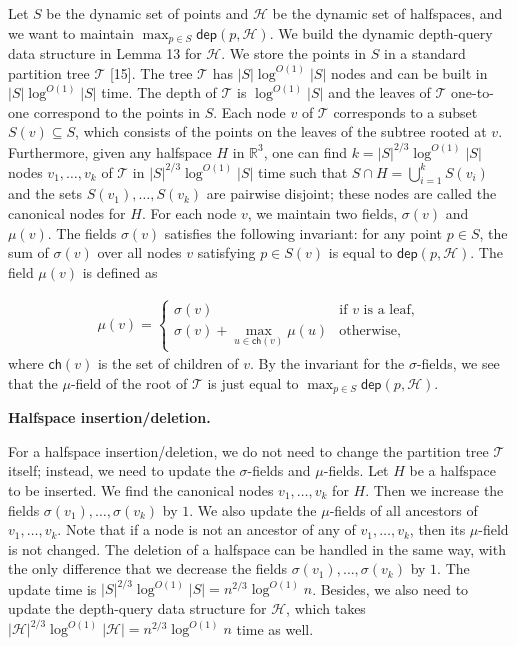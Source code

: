 \documentclass[10pt,a4paper]{article}
\begin{document}
Let $S$ be the dynamic set of points and $\mathcal{H}$ be the dynamic set of halfspaces, and we want to maintain $\max_{p\in S}\mathsf{dep}(p,\mathcal{H})$. We build the dynamic depth-query data structure in Lemma 13 for $\mathcal{H}$. We store the points in $S$ in a standard partition tree $\mathcal{T}$ [15]. The tree $\mathcal{T}$ has $|S|\log^{O(1)}|S|$ nodes and can be built in $|S|\log^{O(1)}|S|$ time. The depth of $\mathcal{T}$ is $\log^{O(1)}|S|$ and the leaves of $\mathcal{T}$ one-to-one correspond to the points in $S$. Each node $v$ of $\mathcal{T}$ corresponds to a subset $S(v)\subseteq S$, which consists of the points on the leaves of the subtree rooted at $v$. Furthermore, given any halfspace $H$ in $\mathbb{R}^{3}$, one can find $k=|S|^{2/3}\log^{O(1)}|S|$ nodes $v_{1},\dots,v_{k}$ of $\mathcal{T}$ in $|S|^{2/3}\log^{O(1)}|S|$ time such that $S\cap H=\bigcup_{i=1}^{k}S(v_{i})$ and the sets $S(v_{1}),\dots,S(v_{k})$ are pairwise disjoint; these nodes are called the canonical nodes for $H$. For each node $v$, we maintain two fields, $\sigma(v)$ and $\mu(v)$. The fields $\sigma(v)$ satisfies the following invariant: for any point $p\in S$, the sum of $\sigma(v)$ over all nodes $v$ satisfying $p\in S(v)$ is equal to ${\mathsf{dep}}(p,\mathcal{H})$. The field $\mu(v)$ is defined as
\par
\[\begin{aligned}
\displaystyle\mu(v)=\begin{cases}\sigma(v)&\text{if }v\text{ is a leaf},\\
\sigma(v)+\max_{u\in\mathsf{ch}(v)}\mu(u)&\text{otherwise,}\end{cases}
\end{aligned}\]
where $\mathsf{ch}(v)$ is the set of children of $v$. By the invariant for the $\sigma$-fields, we see that the $\mu$-field of the root of $\mathcal{T}$ is just equal to $\max_{p\in S}{\mathsf{dep}}(p,\mathcal{H})$.
\par
\par
\par\medskip\noindent\textbf{Halfspace insertion/deletion.}\par
For a halfspace insertion/deletion, we do not need to change the partition tree $\mathcal{T}$ itself; instead, we need to update the $\sigma$-fields and $\mu$-fields. Let $H$ be a halfspace to be inserted. We find the canonical nodes $v_{1},\dots,v_{k}$ for $H$. Then we increase the fields $\sigma(v_{1}),\dots,\sigma(v_{k})$ by $1$. We also update the $\mu$-fields of all ancestors of $v_{1},\dots,v_{k}$. Note that if a node is not an ancestor of any of $v_{1},\dots,v_{k}$, then its $\mu$-field is not changed. The deletion of a halfspace can be handled in the same way, with the only difference that we decrease the fields $\sigma(v_{1}),\dots,\sigma(v_{k})$ by $1$. The update time is $|S|^{2/3}\log^{O(1)}|S|=n^{2/3}\log^{O(1)}n$. Besides, we also need to update the depth-query data structure for $\mathcal{H}$, which takes $|\mathcal{H}|^{2/3}\log^{O(1)}|\mathcal{H}|=n^{2/3}\log^{O(1)}n$ time as well.
\end{document}
